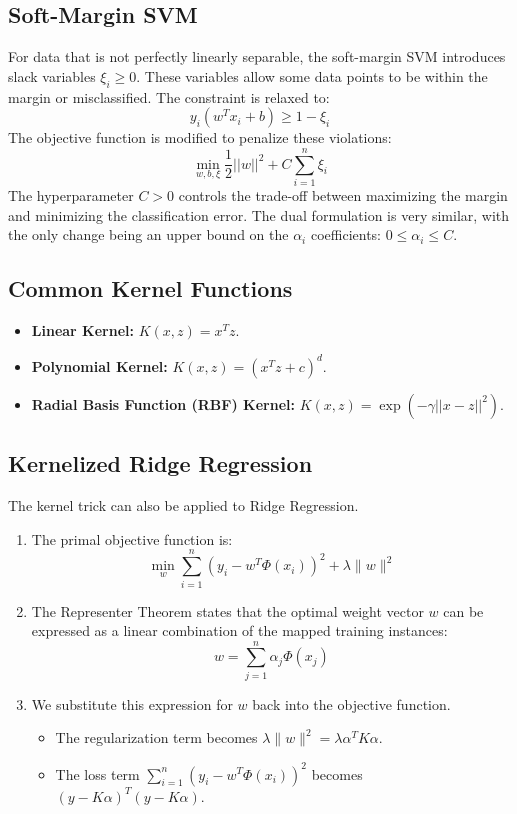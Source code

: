 \documentclass{article}
\begin{document}
\begin{multicols}{2}
	\subsection{Soft-Margin SVM}
	For data that is not perfectly linearly separable, the soft-margin SVM introduces slack variables $\xi_i \ge 0$. These variables allow some data points to be within the margin or misclassified. The constraint is relaxed to:
	$$ y_i(w^T x_i + b) \ge 1 - \xi_i $$
	The objective function is modified to penalize these violations:
	$$ \min_{w, b, \xi} \frac{1}{2}||w||^2 + C \sum_{i=1}^{n} \xi_i $$
	The hyperparameter $C > 0$ controls the trade-off between maximizing the margin and minimizing the classification error. The dual formulation is very similar, with the only change being an upper bound on the $\alpha_i$ coefficients: $0 \le \alpha_i \le C$.

	\subsection{Common Kernel Functions}
	\begin{itemize}
		\item \textbf{Linear Kernel:} $K(x, z) = x^T z$.
		\item \textbf{Polynomial Kernel:} $K(x, z) = (x^T z + c)^d$.
		\item \textbf{Radial Basis Function (RBF) Kernel:} $K(x, z) = \exp(-\gamma ||x - z||^2)$.
	\end{itemize}

	\subsection{Kernelized Ridge Regression}
	The kernel trick can also be applied to Ridge Regression.

	\begin{enumerate}
		\item The primal objective function is:
		      \[
			      \min_{w} \sum_{i=1}^{n} (y_i - w^T \Phi(x_i))^2 + \lambda \|w\|^2
		      \]

		\item The Representer Theorem states that the optimal weight vector $w$ can be expressed as a linear combination of the mapped training instances:
		      \[
			      w = \sum_{j=1}^{n} \alpha_j \Phi(x_j)
		      \]

		\item We substitute this expression for $w$ back into the objective function.
		      \begin{itemize}
			      \item The regularization term becomes $\lambda \|w\|^2 = \lambda \alpha^T K \alpha$.
			      \item The loss term $\sum_{i=1}^{n}(y_i - w^T\Phi(x_i))^2$ becomes $(y - K\alpha)^T (y - K\alpha)$.
		      \end{itemize}


\end{enumerate}
\end{multicols}
\end{document}
